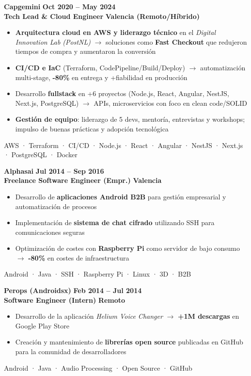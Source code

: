 \documentclass[11pt,a4paper]{article}
\newcommand{\experience}[4]{
    \vspace{0.2em}
    \textbf{\large\color{company}#1} \hfill \textbf{\color{burgundy}#2}\\
    \textbf{\color{role}#3} \hfill \textbf{\color{burgundy}#4}\\
    \vspace{0.1em}
}
\newcommand{\badges}[1]{
    \vspace{0.1em}
    \begin{center}
        \small\color{accent}#1
    \end{center}
    \vspace{0.1em}
}
\newcommand{\achievement}[1]{
    \item #1
}
\begin{document}
\vspace{0.3em}
\experience{Capgemini}{Oct 2020 -- May 2024}{Tech Lead \& Cloud Engineer}{Valencia (Remoto/Híbrido)}
\vspace{0.1em}
\begin{itemize}[leftmargin=1em, itemsep=0.2em]
    \achievement{\textbf{Arquitectura cloud en AWS y liderazgo técnico} en el \textit{Digital Innovation Lab (PostNL)} $\rightarrow$ soluciones como \textbf{Fast Checkout} que redujeron tiempos de compra y aumentaron la conversión}
    \achievement{\textbf{CI/CD e IaC} (Terraform, CodePipeline/Build/Deploy) $\rightarrow$ automatización multi-stage, \textbf{-80\%} en entrega y +fiabilidad en producción}
    \achievement{Desarrollo \textbf{fullstack} en +6 proyectos (Node.js, React, Angular, NestJS, Next.js, PostgreSQL) $\rightarrow$ APIs, microservicios con foco en clean code/SOLID}
    \achievement{\textbf{Gestión de equipo}: liderazgo de 5 devs, mentoría, entrevistas y workshops; impulso de buenas prácticas y adopción tecnológica}
\end{itemize}
\badges{AWS · Terraform · CI/CD · Node.js · React · Angular · NestJS · Next.js · PostgreSQL · Docker}

\vspace{0.3em}
\experience{Alphasai}{Jul 2014 -- Sep 2016}{Freelance Software Engineer (Empr.)}{Valencia}
\vspace{0.1em}
\begin{itemize}[leftmargin=1em, itemsep=0.2em]
    \achievement{Desarrollo de \textbf{aplicaciones Android B2B} para gestión empresarial y automatización de procesos}
    \achievement{Implementación de \textbf{sistema de chat cifrado} utilizando SSH para comunicaciones seguras}
    \achievement{Optimización de costes con \textbf{Raspberry Pi} como servidor de bajo consumo $\rightarrow$ \textbf{-80\%} en costes de infraestructura}
\end{itemize}
\badges{Android · Java · SSH · Raspberry Pi · Linux · 3D · B2B}

\vspace{0.3em}
\experience{Perops (Androidsx)}{Feb 2014 -- Jul 2014}{Software Engineer (Intern)}{Remoto}
\vspace{0.1em}
\begin{itemize}[leftmargin=1em, itemsep=0.2em]
    \achievement{Desarrollo de la aplicación \textit{Helium Voice Changer} $\rightarrow$ \textbf{+1M descargas} en Google Play Store}
    \achievement{Creación y mantenimiento de \textbf{librerías open source} publicadas en GitHub para la comunidad de desarrolladores}
\end{itemize}
\badges{Android · Java · Audio Processing · Open Source · GitHub}
\end{document}
